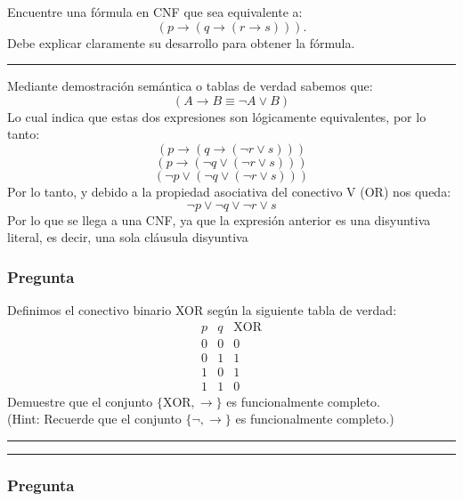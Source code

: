 \documentclass[12pt]{article}
\begin{document}

Encuentre una fórmula en CNF que sea equivalente a:
\[ (p \rightarrow (q \rightarrow (r \to s))). \]
Debe explicar claramente su desarrollo para obtener la fórmula.\\
\rule{\linewidth}{0.2pt} %

Mediante demostración semántica o tablas de verdad sabemos que:
\[ (A \rightarrow B \equiv \neg A \lor B )\]
Lo cual indica que estas dos expresiones son lógicamente equivalentes, por lo tanto:
\[ (p \rightarrow (q \rightarrow (\neg r \lor s)))\] %
\[ (p \rightarrow (\neg q \lor (\neg r \lor s)))\] %
\[ (\neg p \lor (\neg q \lor (\neg r \lor s)))\] %
Por lo tanto, y debido a la propiedad asociativa del conectivo V (OR) nos queda:
\[ \neg p \lor \neg q \lor \neg r \lor s\]
Por lo que se llega a una CNF, ya que la expresión anterior es una disyuntiva literal, es decir,
una sola cláusula disyuntiva



\subsubsection*{Pregunta }

Definimos el conectivo binario XOR según la siguiente tabla de verdad:
\[
\begin{array}{c|c|c}
p & q & \text{XOR} \\ \hline 
0 & 0 & 0 \\ 
0 & 1 & 1 \\ 
1 & 0 & 1 \\ 
1 & 1 & 0 
\end{array}
\]
Demuestre que el conjunto $\{\text{XOR}, \rightarrow\}$ es funcionalmente completo.
\\ (Hint: Recuerde que el conjunto $\{\neg, \rightarrow \}$ es funcionalmente completo.)
\\ \rule{\linewidth}{0.4pt} %



\rule{\linewidth}{0.4pt}


\subsubsection*{Pregunta }
\end{document}

